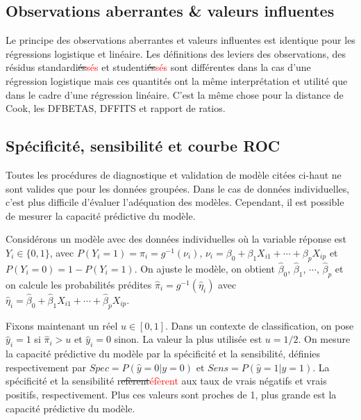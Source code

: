 \documentclass[11pt]{article}
\begin{document}
\subsection{Observations aberrantes \& valeurs influentes}

Le principe des observations aberrantes et valeurs influentes est identique pour les régressions logistique et linéaire. Les définitions des leviers des observations, des résidus standardi\sout{és}\textcolor{red}{sés} et studenti\sout{és}\textcolor{red}{sés} sont différentes dans la cas d'une régression logistique mais ces quantités ont la m\^eme interprétation et utilité que dans le cadre d'une régression linéaire. C'est la m\^eme chose pour la distance de Cook, les DFBETAS, DFFITS et rapport de ratios. 

\subsection{Spécificité, sensibilité et courbe ROC}

Toutes les procédures de diagnostique et validation de modèle citées ci-haut ne sont valides que pour les données groupées. Dans le cas de données individuelles, c'est plus difficile d'évaluer l'adéquation des modèles. Cependant, il est possible de mesurer la capacité prédictive du modèle. 

\noindent Considérons un modèle avec des données individuelles où la variable réponse est $Y_i \in \{0,1\}$, avec $P(Y_i=1)=\pi_i=g^{-1}(\nu_i)$, $\nu_i=\beta_0+\beta_1 X_{i1}+\cdots+\beta_p X_{ip}$ et $P(Y_i=0)=1-P(Y_i=1)$. On ajuste le modèle, on obtient $\hat\beta_0$, $\hat\beta_1$, $\cdots$, $\hat\beta_p$ et on calcule les probabilités prédites $\hat\pi_i=g^{-1}(\hat\eta_i)$ avec $\hat\eta_i=\hat\beta_0+\hat\beta_1 X_{i1}+\cdots+\hat\beta_p X_{ip}$.

\noindent Fixons maintenant un réel $u \in [0,1]$. Dans un contexte de classification, on pose $\hat y_i=1$ si $\hat\pi_i>u$ et $\hat y_i=0$ sinon. La valeur la plus utilisée est $u=1/2$. On mesure la capacité prédictive du modèle par la spécificité et la sensibilité, définies respectivement par $Spec = P(\hat y=0| y=0)$ et $Sens = P(\hat y=1| y=1)$. La spécificité et la sensibilité r\sout{efèrent}\textcolor{red}{éfèrent} aux taux de vrais négatifs et vrais positifs, respectivement. Plus ces valeurs sont proches de 1, plus grande est la capacité prédictive du modèle. 
\end{document}
